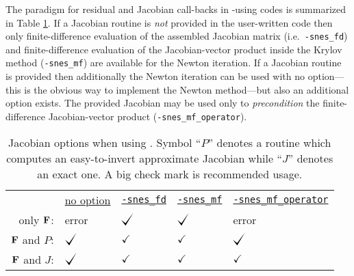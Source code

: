 The paradigm for residual and Jacobian call-backs in \pSNES-using codes is summarized in Table \ref{tab:snesjacobianoptions}.  If a Jacobian routine is \emph{not} provided in the user-written code then only finite-difference evaluation of the assembled Jacobian matrix (i.e.~\texttt{-snes\_fd}) and finite-difference evaluation of the Jacobian-vector product inside the Krylov method (\texttt{-snes\_mf}) are available for the Newton iteration.  If a Jacobian routine is provided then additionally the Newton iteration can be used with no option---this is the obvious way to implement the Newton method---but also an additional option exists.  The provided Jacobian may be used only to \emph{precondition} the finite-difference Jacobian-vector product (\texttt{-snes\_mf\_operator}).
\begin{table}
\begin{tabular}{rllll}
 &\underline{no option}\hspace{0.0in} & \underline{\texttt{-snes\_fd}} & \underline{\texttt{-snes\_mf}} & \underline{\texttt{-snes\_mf\_operator}} \\
only $\mathbf{F}$:      & error           & $\bigcheckmark$ & $\bigcheckmark$ & error \\
$\mathbf{F}$ and $P$:   & $\bigcheckmark$ & $\checkmark$    & $\checkmark$    & $\bigcheckmark$ \\
$\mathbf{F}$ and $J$:   & $\bigcheckmark$ & $\checkmark$    & $\checkmark$    & $\checkmark$
\end{tabular}
\caption{Jacobian options when using \pSNES.  Symbol ``$P$'' denotes a routine which computes an easy-to-invert approximate Jacobian while ``$J$'' denotes an exact one.  A big check mark is recommended usage.} \label{tab:snesjacobianoptions}
\end{table}

